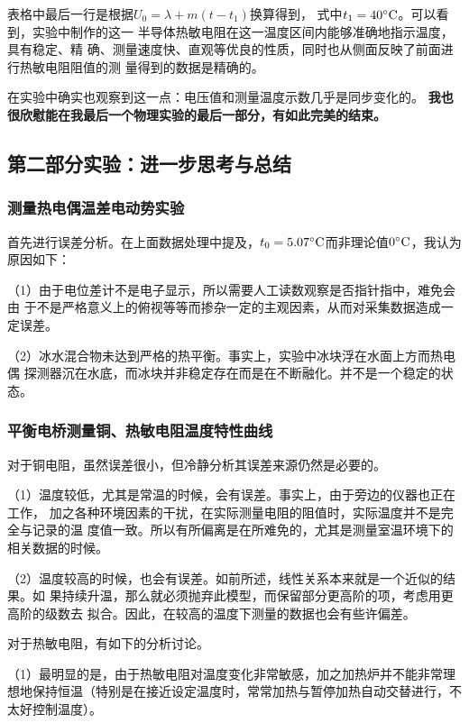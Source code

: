 \documentclass[11pt]{article}
\begin{document}
表格中最后一行是根据$U_0=\lambda+m(t-t_1)$换算得到，
式中$t_1=40^\circ \rm C$。可以看到，实验中制作的这一
半导体热敏电阻在这一温度区间内能够准确地指示温度，具有稳定、精
确、测量速度快、直观等优良的性质，同时也从侧面反映了前面进行热敏电阻阻值的测
量得到的数据是精确的。

在实验中确实也观察到这一点：电压值和测量温度示数几乎是同步变化的。
\textbf{我也很欣慰能在我最后一个物理实验的最后一部分，有如此完美的结束。}



\subsection{第二部分实验：进一步思考与总结}

\subsubsection{测量热电偶温差电动势实验}
首先进行误差分析。在上面数据处理中提及，$t_0=5.07^\circ \rm C$而非理论值$0^\circ \rm C$，我认为原因如下：

（1）由于电位差计不是电子显示，所以需要人工读数观察是否指针指中，难免会由
于不是严格意义上的俯视等等而掺杂一定的主观因素，从而对采集数据造成一定误差。

（2）冰水混合物未达到严格的热平衡。事实上，实验中冰块浮在水面上方而热电偶
探测器沉在水底，而冰块并非稳定存在而是在不断融化。并不是一个稳定的状态。


\subsubsection{平衡电桥测量铜、热敏电阻温度特性曲线}

对于铜电阻，虽然误差很小，但冷静分析其误差来源仍然是必要的。

（1）温度较低，尤其是常温的时候，会有误差。事实上，由于旁边的仪器也正在工作，
加之各种环境因素的干扰，在实际测量电阻的阻值时，实际温度并不是完全与记录的温
度值一致。所以有所偏离是在所难免的，尤其是测量室温环境下的相关数据的时候。

（2）温度较高的时候，也会有误差。如前所述，线性关系本来就是一个近似的结果。如
果持续升温，那么就必须抛弃此模型，而保留部分更高阶的项，考虑用更高阶的级数去
拟合。因此，在较高的温度下测量的数据也会有些许偏差。

\bigskip
对于热敏电阻，有如下的分析讨论。

（1）最明显的是，由于热敏电阻对温度变化非常敏感，加之加热炉并不能非常理
想地保持恒温（特别是在接近设定温度时，常常加热与暂停加热自动交替进行，不太好控制温度）。
\end{document}
